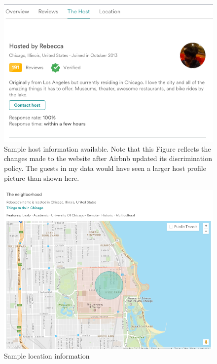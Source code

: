 \begin{figure}
\includegraphics[width=.9\textwidth]{figures/sample4-host}
\caption[Sample host information]{Sample host information available. Note that this Figure reflects the changes made to the website after Airbnb updated its discrimination policy. The guests in my data would have seen a larger host profile picture than shown here.}
\end{figure}
\begin{figure}
\includegraphics[width=.8\textwidth]{figures/sample5-location}
\caption{Sample location information}
\end{figure}
